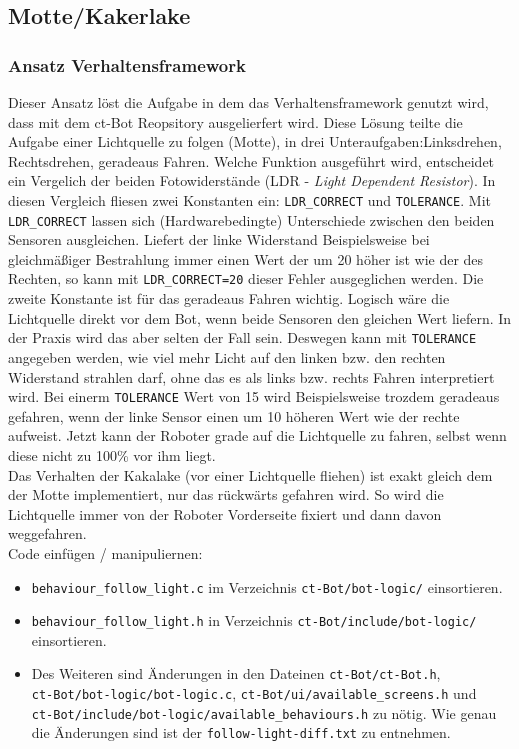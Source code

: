 \subsection{Motte/Kakerlake}
\label{motte_kakerlake}

\subsubsection{Ansatz Verhaltensframework}

Dieser Ansatz löst die Aufgabe in dem das Verhaltensframework
genutzt wird, dass mit dem ct-Bot Reopsitory ausgelierfert wird.
Diese Lösung teilte die Aufgabe einer Lichtquelle zu folgen (Motte), in drei
Unteraufgaben:Linksdrehen, Rechtsdrehen, geradeaus Fahren.
Welche Funktion ausgeführt wird, entscheidet ein Vergelich der beiden Fotowiderstände
(LDR - \textit{Light Dependent Resistor}). In diesen Vergleich fliesen zwei Konstanten ein:
\verb+LDR_CORRECT+ und \verb+TOLERANCE+. Mit \verb+LDR_CORRECT+ lassen sich
(Hardwarebedingte) Unterschiede zwischen den beiden Sensoren ausgleichen. Liefert
der linke Widerstand Beispielsweise bei gleichmäßiger Bestrahlung immer einen
Wert der um 20 höher ist wie der des Rechten, so kann mit \verb+LDR_CORRECT=20+ dieser
Fehler ausgeglichen werden. Die zweite Konstante ist für das geradeaus Fahren wichtig.
Logisch wäre die Lichtquelle direkt vor dem Bot, wenn beide Sensoren den gleichen
Wert liefern. In der Praxis wird das aber selten der Fall sein. Deswegen kann mit
\verb+TOLERANCE+ angegeben werden, wie viel mehr Licht auf den linken bzw. den rechten
Widerstand strahlen darf, ohne das es als links bzw. rechts Fahren interpretiert wird.
Bei einerm \verb+TOLERANCE+ Wert von 15 wird Beispielsweise trozdem geradeaus gefahren,
wenn der linke Sensor einen um 10 höheren Wert wie der rechte aufweist. Jetzt kann
der Roboter grade auf die Lichtquelle zu fahren, selbst wenn diese nicht zu 100\%
vor ihm liegt. \\

Das Verhalten der Kakalake (vor einer Lichtquelle fliehen) ist exakt gleich dem der 
Motte implementiert, nur das rückwärts gefahren wird. So wird die Lichtquelle immer
von der Roboter Vorderseite fixiert und dann davon weggefahren. \\

Code einfügen / manipuliernen:
\begin{itemize}
    \item \verb+behaviour_follow_light.c+  im Verzeichnis 
        \verb+ct-Bot/bot-logic/+ einsortieren.
    \item \verb+behaviour_follow_light.h+ in Verzeichnis
        \verb+ct-Bot/include/bot-logic/+ einsortieren.
    \item Des Weiteren sind Änderungen in den Dateinen \verb+ct-Bot/ct-Bot.h+, \\
        \verb+ct-Bot/bot-logic/bot-logic.c+,
        \verb+ct-Bot/ui/available_screens.h+ und \\
        \verb+ct-Bot/include/bot-logic/available_behaviours.h+ zu nötig.
        Wie genau die Änderungen sind ist der \verb+follow-light-diff.txt+ zu entnehmen.
\end{itemize}

